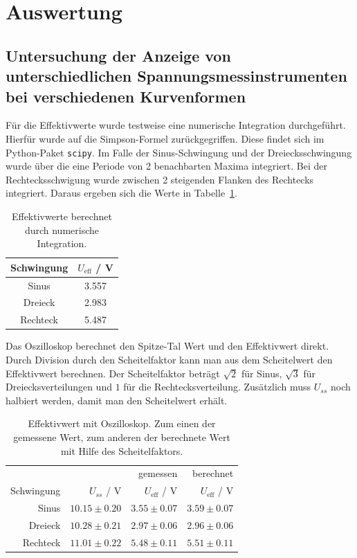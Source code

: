 \documentclass{article}
\begin{document}
\section{Auswertung}

\subsection{Untersuchung  der  Anzeige  von  unterschiedlichen  Spannungsmessinstrumenten  bei verschiedenen Kurvenformen }





Für die Effektivwerte wurde testweise eine numerische Integration durchgeführt. Hierfür wurde auf die Simpson-Formel zurückgegriffen. Diese findet sich im Python-Paket \texttt{scipy}. Im Falle der Sinus-Schwingung und der Dreiecksschwingung wurde über die eine Periode von 2 benachbarten Maxima integriert. Bei der Rechtecksschwigung wurde zwischen 2 steigenden Flanken des Rechtecks integriert. Daraus ergeben sich die Werte in Tabelle~\ref{tab:task1_num_int}.
\begin{table}[H]
\caption{Effektivwerte berechnet durch numerische Integration.}
\label{tab:task1_num_int}
\begin{tabular}{c|c}
Schwingung &  $U_\text{eff}$ / V  \\
\hline
Sinus &  3.557 \\
Dreieck & 2.983 \\
Rechteck & 5.487
\end{tabular}
\end{table}



Das Oszilloskop berechnet den Spitze-Tal Wert und den Effektivwert direkt. Durch Division durch den Scheitelfaktor kann man aus dem Scheitelwert den Effektivwert berechnen. Der Scheitelfaktor beträgt $\sqrt{2}$ für Sinus, $\sqrt{3}$ für Dreiecksverteilungen und $1$ für die Rechtecksverteilung. Zusätzlich muss $U_{ss}$ noch halbiert werden, damit man den Scheitelwert erhält.

\begin{table}[H]
\centering
\caption{Effektivwert mit Oszilloskop. Zum einen der gemessene Wert, zum anderen der berechnete Wert mit Hilfe des Scheitelfaktors.}
\label{tab:auswertung_task1_oszi}
\begin{tabular}{r|rrr}
 & & gemessen & berechnet \\
 Schwingung &  $U_{ss}$ / V &  $U_\text{eff}$ / V  &  $U_\text{eff}$ / V\\
\hline
Sinus & $10.15 \pm 0.20$ & $3.55 \pm 0.07$ & $3.59 \pm 0.07$ \\
Dreieck & $10.28 \pm 0.21$ & $2.97 \pm 0.06$ & $2.96 \pm 0.06$ \\
Rechteck & $11.01 \pm 0.22$ & $5.48 \pm 0.11$ & $5.51 \pm 0.11$
\end{tabular}
\end{table}
\end{document}
